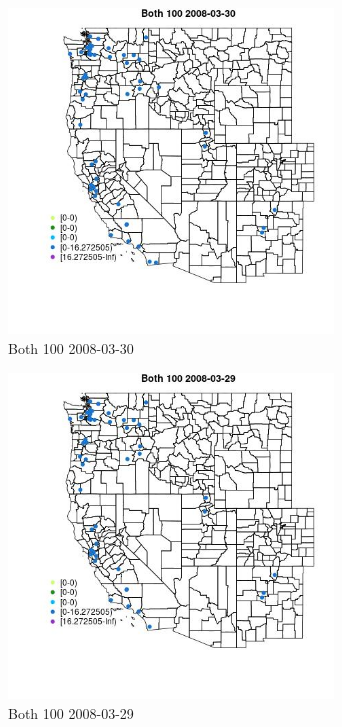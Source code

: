 \begin{figure} 
\centering  
\includegraphics[width=0.77\textwidth]{Code_Outputs/Report_ML_input_PM25_Step4_part_e_de_duplicated_aves_MapObsBoth_1002008-03-30.jpg} 
\caption{\label{fig:Report_ML_input_PM25_Step4_part_e_de_duplicated_avesMapObsBoth_1002008-03-30}Both 100 2008-03-30} 
\end{figure} 
 

\begin{figure} 
\centering  
\includegraphics[width=0.77\textwidth]{Code_Outputs/Report_ML_input_PM25_Step4_part_e_de_duplicated_aves_MapObsBoth_1002008-03-29.jpg} 
\caption{\label{fig:Report_ML_input_PM25_Step4_part_e_de_duplicated_avesMapObsBoth_1002008-03-29}Both 100 2008-03-29} 
\end{figure} 
 

